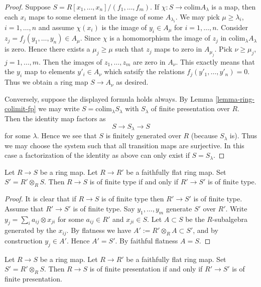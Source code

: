 \begin{proof}
Suppose $S = R[x_1, \ldots, x_n] / (f_1, \ldots, f_m)$.
If $\chi : S \to \text{colim} A_\lambda$ is a map, then each
$x_i$ maps to some element in the image of some $A_{\lambda_i}$.
We may pick $\mu \geq \lambda_i$, $i = 1, \ldots, n$ and
assume $\chi(x_i)$ is the image of $y_i \in A_\mu$ for
$i = 1, \ldots, n$. Consider $z_j = f_j(y_1, \ldots, y_n) \in A_\mu$.
Since $\chi$ is a homomorphism the image of $z_j$ in
$\text{colim}_\lambda A_\lambda$ is zero. Hence there exists a
$\mu_j \geq \mu$ such that $z_j$ maps to zero in $A_{\mu_j}$.
Pick $\nu \geq \mu_j$, $j = 1, \ldots, m$. Then the
images of $z_1, \ldots, z_m$ are zero in $A_\nu$. This
exactly means that the $y_i$ map to elements
$y'_i \in A_\nu$ which satsify the relations $f_j(y'_1, \ldots, y'_n) = 0$.
Thus we obtain a ring map $S \to A_\nu$ as desired.

\medskip\noindent
Conversely, suppose the displayed formula holds always.
By Lemma \ref{lemma-ring-colimit-fp} we may write
$S = \text{colim}_\lambda S_\lambda$ with $S_\lambda$
of finite presentation over $R$. Then the identity map
factors as
$$
S \to S_\lambda \to S
$$
for some $\lambda$. Hence we see that $S$ is finitely generated
over $R$ (because $S_\lambda$ is). Thus we may choose the system
such that all transition maps are surjective. In this case
a factorization of the identity as above can only exist if
$S = S_\lambda$.
\end{proof}

\begin{lemma}
\label{lemma-finite-type-descends}
Let $R \to S$ be a ring map.
Let $R \to R'$ be a faithfully flat ring map.
Set $S' = R'\otimes_R S$.
Then $R \to S$ is of finite type if and only if $R' \to S'$
is of finite type.
\end{lemma}

\begin{proof}
It is clear that if $R \to S$ is of finite type then $R' \to S'$
is of finite type. Assume that $R' \to S'$ is of finite type.
Say $y_1, \ldots, y_m$ generate $S'$ over $R'$.
Write $y_j = \sum_i a_{ij} \otimes x_{ji}$ for some
$a_{ij} \in R'$ and $x_{ji} \in S$. Let $A \subset S$
be the $R$-subalgebra generated by the $x_{ij}$.
By flatness we have $A' := R' \otimes_R A \subset S'$, and
by construction $y_j \in A'$. Hence $A' = S'$.
By faithful flatness $A = S$.
\end{proof}

\begin{lemma}
\label{lemma-finite-presentation-descends}
Let $R \to S$ be a ring map.
Let $R \to R'$ be a faithfully flat ring map.
Set $S' = R'\otimes_R S$.
Then $R \to S$ is of finite presentation if and only if $R' \to S'$
is of finite presentation.
\end{lemma}

